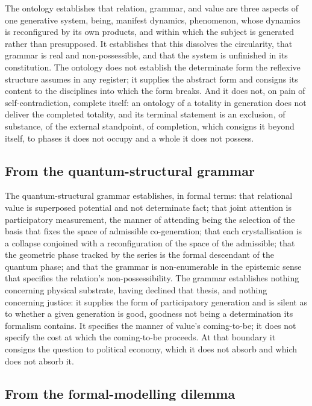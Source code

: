 The ontology establishes that relation, grammar, and value are three aspects of one generative system, being, manifest dynamics, phenomenon, whose dynamics is reconfigured by its own products, and within which the subject is generated rather than presupposed. It establishes that this dissolves the circularity, that grammar is real and non-possessible, and that the system is unfinished in its constitution. The ontology does not establish the determinate form the reflexive structure assumes in any register; it supplies the abstract form and consigns its content to the disciplines into which the form breaks. And it does not, on pain of self-contradiction, complete itself: an ontology of a totality in generation does not deliver the completed totality, and its terminal statement is an exclusion, of substance, of the external standpoint, of completion, which consigns it beyond itself, to phases it does not occupy and a whole it does not possess.

\subsection{From the quantum-structural grammar}
\label{p10:sec:concl-grammar}

The quantum-structural grammar establishes, in formal terms: that relational value is superposed potential and not determinate fact; that joint attention is participatory measurement, the manner of attending being the selection of the basis that fixes the space of admissible co-generation; that each crystallisation is a collapse conjoined with a reconfiguration of the space of the admissible; that the geometric phase tracked by the series is the formal descendant of the quantum phase; and that the grammar is non-enumerable in the epistemic sense that specifies the relation's non-possessibility. The grammar establishes nothing concerning physical substrate, having declined that thesis, and nothing concerning justice: it supplies the form of participatory generation and is silent as to whether a given generation is good, goodness not being a determination its formalism contains. It specifies the manner of value's coming-to-be; it does not specify the cost at which the coming-to-be proceeds. At that boundary it consigns the question to political economy, which it does not absorb and which does not absorb it.

\subsection{From the formal-modelling dilemma}
\label{p10:sec:concl-modelling}

